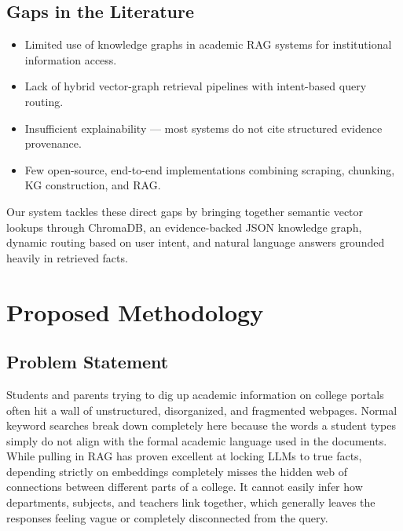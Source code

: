 \documentclass[12pt,a4paper]{report}
\begin{document}
\section{Gaps in the Literature}

\begin{itemize}
  \item Limited use of knowledge graphs in academic RAG systems for institutional information access.
  \item Lack of hybrid vector-graph retrieval pipelines with intent-based query routing.
  \item Insufficient explainability — most systems do not cite structured evidence provenance.
  \item Few open-source, end-to-end implementations combining scraping, chunking, KG construction, and RAG.
\end{itemize}

\par
Our system tackles these direct gaps by bringing together semantic vector lookups through ChromaDB, an evidence-backed JSON knowledge graph, dynamic routing based on user intent, and natural language answers grounded heavily in retrieved facts.
\clearpage

\chapter{Proposed Methodology}

\section{Problem Statement}

Students and parents trying to dig up academic information on college portals often hit a wall of unstructured, disorganized, and fragmented webpages. Normal keyword searches break down completely here because the words a student types simply do not align with the formal academic language used in the documents. While pulling in RAG has proven excellent at locking LLMs to true facts, depending strictly on embeddings completely misses the hidden web of connections between different parts of a college. It cannot easily infer how departments, subjects, and teachers link together, which generally leaves the responses feeling vague or completely disconnected from the query.
\end{document}
